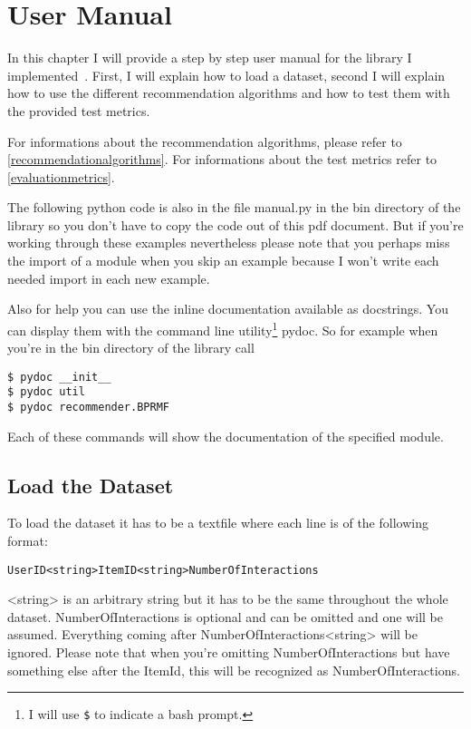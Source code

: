 \chapter{User Manual}
In this chapter I will provide a step by step user manual for the library I implemented~\cite{recsyslab}.
First, I will explain how to load a dataset, second I
will explain how to use the different recommendation algorithms and
how to test them with the provided test metrics. 

For informations about the recommendation algorithms, please refer to \ref{recommendationalgorithms}.
For informations about the test metrics refer to \ref{evaluationmetrics}.

The following python code is also in the file manual.py in the bin directory of the library
so you don't have to copy the code out of this pdf document. But if you're working through these examples
nevertheless please note that you perhaps miss the import of a module when you skip an example because
I won't write each needed import in each new example.

Also for help you can use the inline documentation available as docstrings.
You can display them with the command line utility\footnote{I will use \lstinline!$! to indicate a bash prompt.} pydoc.
So for example when you're in the bin directory of the library call

\begin{lstlisting}
$ pydoc __init__
$ pydoc util 
$ pydoc recommender.BPRMF
\end{lstlisting}
Each of these commands will show the documentation of the specified module.


\section{Load the Dataset}
To load the dataset it has to be a textfile where each line is of the following format:
\begin{lstlisting}
UserID<string>ItemID<string>NumberOfInteractions
\end{lstlisting}
<string> is an arbitrary string but it has to be the same throughout the whole dataset.
NumberOfInteractions is optional and can be omitted and one will be assumed.
Everything coming after NumberOfInteractions<string> will be ignored.
Please note that when you're omitting NumberOfInteractions but have something else after
the ItemId, this will be recognized as NumberOfInteractions.

